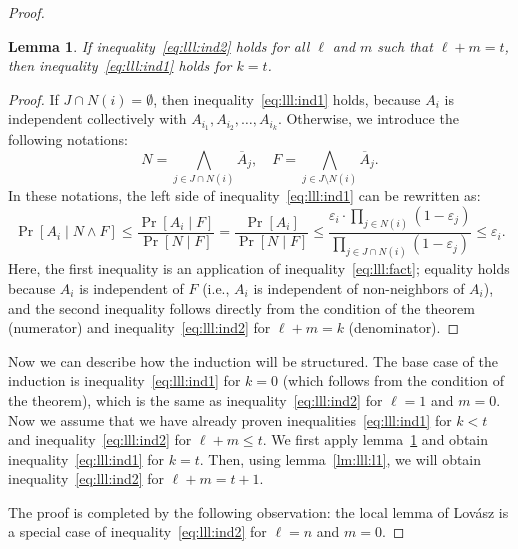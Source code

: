 \documentclass[12pt,sans]{article}
\newcommand{\seqin}[3]{{#1}_{{#2}_1},{#1}_{{#2}_2},\dotsc,{#1}_{{#2}_{#3}}}
\theoremstyle{definition}
\theoremstyle{plain}
\newtheorem{lemma}{Lemma}[section]
\theoremstyle{remark}
\begin{document}
\begin{proof}
    \begin{lemma}\label{lm:lll:l2}
        If inequality~\eqref{eq:lll:ind2} holds for all $\ell$ and $m$ such that $\ell + m = t$, then inequality~\eqref{eq:lll:ind1} holds for $k = t$.
    \end{lemma}
    \begin{proof}
        If $J \cap N(i) = \emptyset$, then inequality~\eqref{eq:lll:ind1} holds, because
        $A_i$ is independent collectively with $\seqin{A}{i}{k}$. Otherwise, we introduce the following notations:
        \[N = \bigwedge_{j \in J \cap N(i)} \overline A_j,\quad
        F = \bigwedge_{j \in J \setminus N(i)} \overline A_j.
        \]
        In these notations, the left side of inequality~\eqref{eq:lll:ind1} can be rewritten as:
        \[
        \Pr[A_i \mid N \land F]
        \le \frac{\Pr[A_i \mid F]}{\Pr[N \mid F]}
        =   \frac{\Pr[A_i]}{\Pr[N \mid F]}
        \le \frac{\varepsilon_i \cdot \prod_{j \in N(i)} (1 - \varepsilon_j)}
        {\prod_{j \in J \cap N(i)} (1 - \varepsilon_j)} \le \varepsilon_i.
        \]
        Here, the first inequality is an application of inequality~\eqref{eq:lll:fact}; equality holds
        because $A_i$ is independent of $F$ (i.e., $A_i$ is independent of non-neighbors of $A_i$), and the second inequality
        follows directly from the condition of the theorem (numerator) and inequality~\eqref{eq:lll:ind2} for $\ell + m = k$ (denominator).
    \end{proof}

    Now we can describe how the induction will be structured. The base case of the induction is inequality~\eqref{eq:lll:ind1}
    for $k = 0$ (which follows from the condition of the theorem), which is the same as inequality~\eqref{eq:lll:ind2} for
    $\ell = 1$ and $m = 0$.
    Now we assume that we have already proven inequalities~\eqref{eq:lll:ind1} for $k < t$ and inequality~\eqref{eq:lll:ind2} for
    $\ell + m \le t$. We first apply lemma~\ref{lm:lll:l2} and obtain inequality~\eqref{eq:lll:ind1} for $k = t$.
    Then, using lemma~\ref{lm:lll:l1}, we will obtain inequality~\eqref{eq:lll:ind2} for $\ell + m = t + 1$.

    The proof is completed by the following observation: the local lemma of Lovász is a special case of
    inequality~\eqref{eq:lll:ind2} for $\ell = n$ and $m = 0$.
\end{proof}
\end{document}
